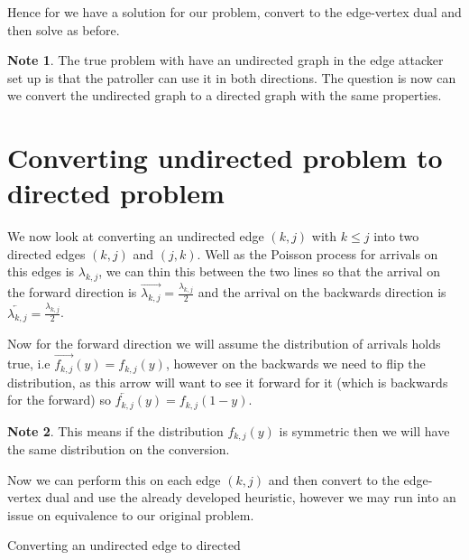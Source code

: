 \documentclass[a4paper,10pt]{article}
\theoremstyle{definition}
\theoremstyle{definition}
\theoremstyle{remark}
\theoremstyle{definition}
\newtheorem*{note}{Note}
\begin{document}
Hence for we have a solution for our problem, convert to the edge-vertex dual and then solve as before.

\begin{note}
The true problem with have an undirected graph in the edge attacker set up is that the patroller can use it in both directions. The question is now can we convert the undirected graph to a directed graph with the same properties.
\end{note}

\section{Converting undirected problem to directed problem}
We now look at converting an undirected edge $(k,j)$ with $k \leq j$ into two directed edges $(k,j)$ and $(j,k)$. Well as the Poisson process for arrivals on this edges is $\lambda_{k,j}$, we can thin this between the two lines so that the arrival on the forward direction is $\overrightarrow{\lambda_{k,j}}=\frac{\lambda_{k,j}}{2}$ and the arrival on the backwards direction is
$\overleftarrow{\lambda_{k,j}}=\frac{\lambda_{k,j}}{2}$.

Now for the forward direction we will assume the distribution of arrivals holds true, i.e $\overrightarrow{f_{k,j}}(y)=f_{k,j}(y)$, however on the backwards we need to flip the distribution, as this arrow will want to see it forward for it (which is backwards for the forward) so $\overleftarrow{f_{k,j}}(y)=f_{k,j}(1-y)$.

\begin{note}
This means if the distribution $f_{k,j}(y)$ is symmetric then we will have the same distribution on the conversion.
\end{note}

Now we can perform this on each edge $(k,j)$ and then convert to the edge-vertex dual and use the already developed heuristic, however we may run into an issue on equivalence to our original problem.

\begin{myfigure}
\begin{center}
\end{center}
\caption{Converting an undirected edge to directed}
\end{myfigure}
\end{document}
